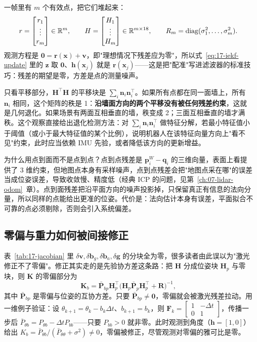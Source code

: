 一帧里有 $m$ 个有效点，把它们堆起来：
\begin{equation}\label{eq:17-Hstack}
  r=\begin{bmatrix}r_1\\\vdots\\r_m\end{bmatrix}\in\mathbb{R}^m,\qquad
  H=\begin{bmatrix}H_1\\\vdots\\H_m\end{bmatrix}\in\mathbb{R}^{m\times18},\qquad
  R_m=\operatorname{diag}(\sigma_1^2,\dots,\sigma_m^2).
\end{equation}
观测方程是 $\bm{0}=\bm{r}(\bm{x})+\bm{v}$，即"理想情况下残差应为零"，所以式~\eqref{eq:17-iekf-update} 里的 $\bm{z}$ 取 $\bm{0}$、$\bm{h}(\bm{x}_j)$ 就是 $\bm{r}(\bm{x}_j)$——这是把"配准"写进滤波器的标准技巧：残差的期望是零，方差是点的测量噪声。

只看平移部分，$\bm{H}^{\top}\bm{H}$ 的平移块是 $\sum_i\bm{n}_i\bm{n}_i^{\top}$。如果所有点都在同一面墙上，所有 $\bm{n}_i$ 相同，这个矩阵的秩是 1：\textbf{沿墙面方向的两个平移没有被任何残差约束}，这就是几何退化。如果场景有两面互相垂直的墙，秩变成 2；三面互相垂直的墙才满秩。这个观察直接给出退化检测方法：对 $\sum_i\bm{n}_i\bm{n}_i^{\top}$ 做特征分解，若最小特征值小于阈值（或小于最大特征值的某个比例），说明机器人在该特征向量方向上"看不见"约束，此时应当依赖 IMU 先验，或者降低该方向的更新增益。

为什么用点到面而不是点到点？点到点残差是 $\bm{p}_i^{W}-\bm{q}_i$ 的三维向量，表面上看提供了 3 维约束，但地图点本身有采样噪声，点到点残差会把"地图点采在哪"的误差当成位姿误差，导致收敛慢、精度低（经典 ICP 的问题，见第~\ref{ch:07-lidar-odom}~章）。点到面残差把沿平面方向的噪声投影掉，只保留真正有信息的法向分量，所以同样的点能给出更准的位姿。代价是：法向估计本身有误差，平面拟合不可靠的点必须剔除，否则会引入系统偏差。

\subsection{零偏与重力如何被间接修正}\label{sec:17-tight-remark}

表~\ref{tab:17-jacobian} 里 $\delta\bm{v},\delta\bm{b}_g,\delta\bm{b}_a,\delta\bm{g}$ 的分块全为零，很多读者由此误以为"激光修正不了零偏"。修正其实走的是先验协方差这条路：把 $\bm{H}$ 分成位姿块 $\bm{H}_p$ 与零块，则 $\bm{K}$ 的零偏部分为
\begin{equation}\label{eq:17-K-bias}
  \bm{K}_{b}=\bar{\bm{P}}_{bp}\bm{H}_p^{\top}\bigl(\bm{H}_p\bar{\bm{P}}_{p}\bm{H}_p^{\top}+\bm{R}\bigr)^{-1},
\end{equation}
其中 $\bar{\bm{P}}_{bp}$ 是零偏与位姿的互协方差。只要 $\bar{\bm{P}}_{bp}\neq\bm{0}$，零偏就会被激光残差拉动。用一维例子验证：设 $\theta_{k+1}=\theta_k-b_k\Delta t$、$b_{k+1}=b_k$，则 $\bm{F}_k=\begin{bmatrix}1&-\Delta t\\0&1\end{bmatrix}$，传播一步后 $\bar{P}_{\theta b}=P_{\theta b}-\Delta tP_{bb}$——只要 $P_{bb}>0$ 就非零。此时观测到角度（$\bm{h}=[1,0]$）给出 $K_b=\bar{P}_{\theta b}/(\bar{P}_{\theta\theta}+\sigma^2)\neq0$，零偏被修正，尽管观测对零偏的雅可比是零。


